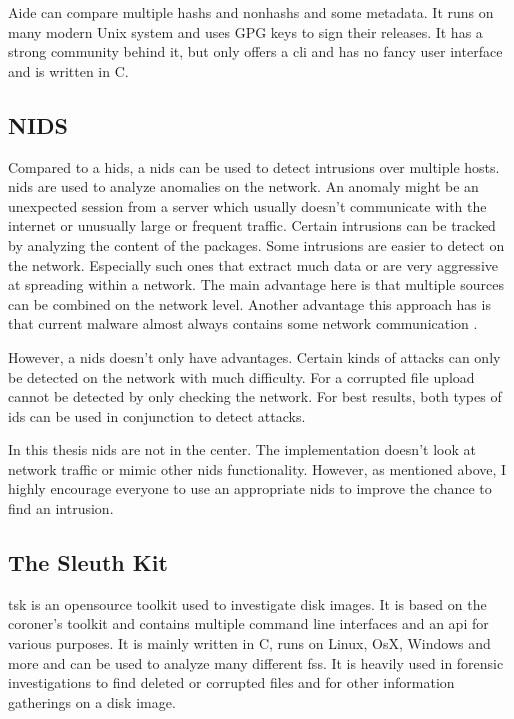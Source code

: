 Aide can compare multiple \glspl{hash} and \glspl{nonhash} and some \gls{metadata}. It runs on many modern Unix system \cite{aide} and uses GPG keys to sign their releases. It has a strong community behind it, but only offers a \gls{cli} and has no fancy user interface and is written in C. \cite{aide:github} 


\subsection{NIDS}
\label{sec:def:nids}

Compared to a \gls{hids}, a \gls{nids} can be used to detect intrusions over multiple hosts. \gls{nids} are used to analyze anomalies on the network. An \gls{anomaly} might be an unexpected session from a server which usually doesn't communicate with the internet or unusually large or frequent traffic. Certain intrusions can be tracked by analyzing the content of the packages. Some intrusions are easier to detect on the network. Especially such ones that extract much data or are very aggressive at spreading within a network. The main advantage here is that multiple sources can be combined on the network level. Another advantage this approach has is that current \gls{malware} almost always contains some network communication \cite{Malware:Behaviour,nids}.

However, a \gls{nids} doesn't only have advantages. Certain kinds of attacks can only be detected on the network with much difficulty. For a corrupted file upload cannot be detected by only checking the network. For best results, both types of \gls{ids} can be used in conjunction to detect attacks. 

In this thesis \gls{nids} are not in the center. The implementation doesn't look at network traffic or mimic other \gls{nids} functionality. However, as mentioned above, I highly encourage everyone to use an appropriate \gls{nids} to improve the chance to find an intrusion. 

\subsection{The Sleuth Kit}
\label{sec:tsk}

\gls{tsk} is an \gls{opensource} toolkit used to investigate disk images. It is based on the coroner's toolkit \cite{tct} and contains multiple command line interfaces and an \gls{api} for various purposes. \cite{tsk, tsk:about} It is mainly written in C, runs on Linux, OsX, Windows and more and can be used to analyze many different \glspl{fs}. It is heavily used in forensic investigations to find deleted or corrupted files and for other information gatherings on a disk image.

